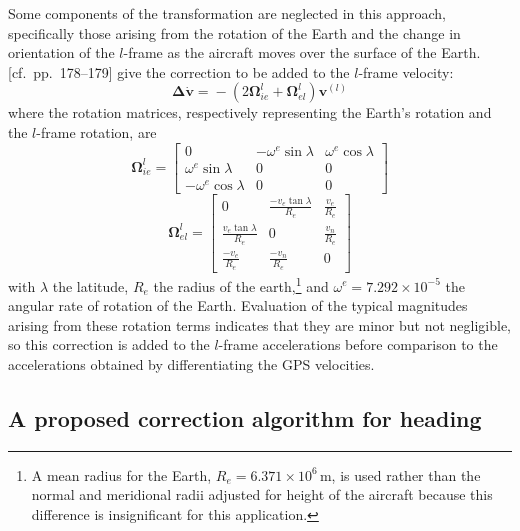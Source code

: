 \documentclass[english,british,amtd,bookmarks=false,unicode=true]{copernicus}\usepackage[]{graphicx}\usepackage[]{color}
\begin{document}
Some components of the transformation are neglected in this approach,
specifically those arising from the rotation of the Earth and the
change in orientation of the $l$-frame as the aircraft moves over
the surface of the Earth. \citet{noureldin2013fundamentals} {[}cf.~pp.~178--179{]}
give the correction to be added to the $l$-frame velocity:\\
\begin{equation}
\mathbf{\boldsymbol{\Delta\dot{\mathbf{v}}}=}-(2\boldsymbol{\Omega}_{ie}^{l}+\boldsymbol{\Omega}_{el}^{l})\mathbf{v}^{(l)}\label{eq:rotation-correction}
\end{equation}
where the rotation matrices, respectively representing the Earth's
rotation and the $l$-frame rotation, are\\
\begin{equation}
\boldsymbol{\Omega}_{ie}^{l}=\left[\begin{array}{ccc}
0 & -\omega^{e}\sin\lambda & \omega^{e}\cos\lambda\\
\omega^{e}\sin\lambda & 0 & 0\\
-\omega^{e}\cos\lambda & 0 & 0
\end{array}\right]\label{eq:first-omega-eq}
\end{equation}
\begin{equation}
\boldsymbol{\Omega}_{el}^{l}=\left[\begin{array}{ccc}
0 & \frac{-v_{e}\tan\lambda}{R_{e}} & \frac{v_{e}}{R_{e}}\\
\frac{v_{e}\tan\lambda}{R_{e}} & 0 & \frac{v_{n}}{R_{e}}\\
\frac{-v_{e}}{R_{e}} & \frac{-v_{n}}{R_{e}} & 0
\end{array}\right]\label{eq:second-omega-equation}
\end{equation}
with $\lambda$ the latitude, $R_{e}$ the radius of the earth,\footnote{A mean radius for the Earth, $R_{e}=6.371\times10^{6}$\,m, is used
rather than the normal and meridional radii adjusted for height of
the aircraft because this difference is insignificant for this application.} and $\omega^{e}=7.292\times10^{-5}$ the angular rate of rotation
of the Earth. Evaluation of the typical magnitudes arising from these
rotation terms indicates that they are minor but not negligible, so
this correction is added to the $l$-frame accelerations before comparison
to the accelerations obtained by differentiating the GPS velocities.


\subsection{A proposed correction algorithm for heading}
\end{document}
